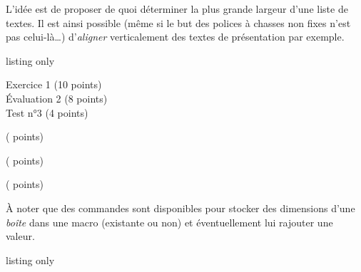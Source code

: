 \documentclass[french,11pt,a4paper]{article}
\begin{document}
L'idée est de proposer de quoi déterminer la plus grande largeur d'une liste de textes. Il est ainsi possible (même si le but des polices à chasses non fixes n'est pas celui-là\ldots) d'\textit{aligner} verticalement des textes de présentation par exemple.

\begin{DemoCode}{listing only}

\end{DemoCode}

\begin{DemoCode}{}
\the\tmpwideststring
\end{DemoCode}

\begin{DemoCode}{}
\sffamily\Large
Exercice 1 (10 points)\\
Évaluation 2 (8 points) \\
Test n°3 (4 points)
\end{DemoCode}

\begin{DemoCode}{}
\sffamily\Large
{} 
( points)

( points)

( points)
\end{DemoCode}

À noter que des commandes sont disponibles pour stocker des dimensions d'une \textit{boîte} dans une macro (existante ou non) et éventuellement lui rajouter une valeur.

\begin{DemoCode}{listing only}
\end{DemoCode}

\begin{DemoCode}{}
\def\tmpbox{\large $1+\frac{1}{x}$}
%
\storewidthtolength{\tmpbox}{\mytmpboxwidth}\the\mytmpboxwidth

\storewidthtolength[10pt]{\tmpbox}{\mytmpboxwidthdelta}\the\mytmpboxwidthdelta

\storeheighttolength{\tmpbox}{\mytmpboxheight}\the\mytmpboxheight

\storetotalheighttolength{\tmpbox}{\mytmpboxtotheight}\the\mytmpboxtotheight

\storedepthtolength{\tmpbox}{\mytmpboxdepth}\the\mytmpboxdepth
\end{DemoCode}
\end{document}
